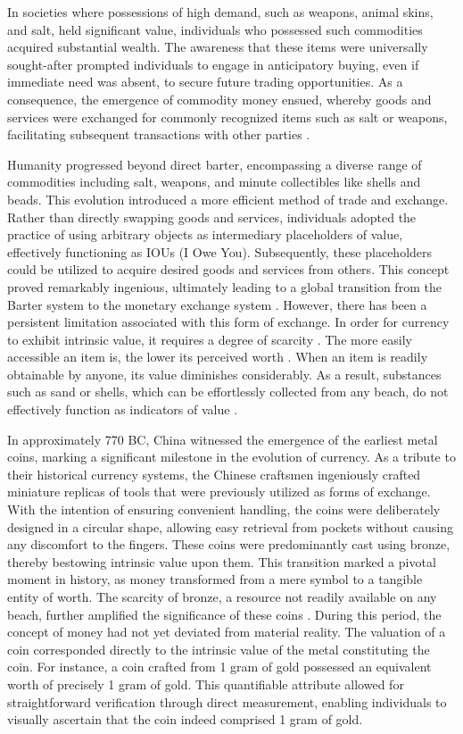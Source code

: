 In societies where possessions of high demand, such as weapons, animal skins, and salt, held significant value, individuals who possessed such commodities
acquired substantial wealth. The awareness that these items were universally sought-after prompted individuals to engage in anticipatory buying, even if
immediate need was absent, to secure future trading opportunities. As a consequence, the emergence of commodity money ensued, whereby goods and services
were exchanged for commonly recognized items such as salt or weapons, facilitating subsequent transactions with other parties \cite{polanyi1965trade}.

Humanity progressed beyond direct barter, encompassing a diverse range of commodities including salt, weapons, and minute collectibles like shells and beads.
This evolution introduced a more efficient method of trade and exchange. Rather than directly swapping goods and services, individuals adopted the practice
of using arbitrary objects as intermediary placeholders of value, effectively functioning as IOUs (I Owe You). Subsequently, these placeholders could be
utilized to acquire desired goods and services from others. This concept proved remarkably ingenious, ultimately leading to a global transition from the
Barter system to the monetary exchange system \cite{graeber2012debt}. However, there has been a persistent limitation associated with this form of exchange. In order for currency to exhibit intrinsic value, it requires a degree of scarcity \cite{smith2010wealth, ricardo1821principles}. The more easily accessible an item is, the lower its perceived worth \cite{marshall2009principles}. When an item is readily obtainable by anyone, its value diminishes considerably. As a result, substances such as sand or shells, which can be effortlessly collected from any beach, do not effectively function as indicators of value \cite{principlesmenger, hicks1936keynes}.

In approximately 770 BC, China witnessed the emergence of the earliest metal coins, marking a significant milestone in the evolution of currency. As a
tribute to their historical currency systems, the Chinese craftsmen ingeniously crafted miniature replicas of tools that were previously utilized as
forms of exchange. With the intention of ensuring convenient handling, the coins were deliberately designed in a circular shape, allowing easy retrieval
from pockets without causing any discomfort to the fingers. These coins were predominantly cast using bronze, thereby bestowing intrinsic value upon them.
This transition marked a pivotal moment in history, as money transformed from a mere symbol to a tangible entity of worth. The scarcity of bronze, a
resource not readily available on any beach, further amplified the significance of these coins \cite{li2003, hartill2005}. During this period, the concept of money had not yet deviated from material reality. The valuation of a coin corresponded directly to the intrinsic value of the metal constituting the coin. For instance, a coin crafted from 1 gram of gold possessed an equivalent worth of precisely 1 gram of gold. This quantifiable attribute allowed for straightforward verification through direct measurement, enabling individuals to visually ascertain that the coin indeed comprised 1 gram of gold.

